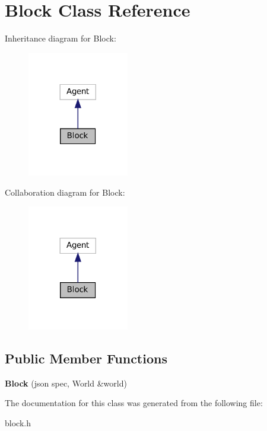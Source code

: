 \hypertarget{classBlock}{}\section{Block Class Reference}
\label{classBlock}


Inheritance diagram for Block\+:
\nopagebreak
\begin{figure}[H]
\begin{center}
\leavevmode
\includegraphics[width=125pt]{classBlock__inherit__graph}
\end{center}
\end{figure}


Collaboration diagram for Block\+:
\nopagebreak
\begin{figure}[H]
\begin{center}
\leavevmode
\includegraphics[width=125pt]{classBlock__coll__graph}
\end{center}
\end{figure}
\subsection*{Public Member Functions}
\begin{DoxyCompactItemize}
\item 
\mbox{\label{classBlock_a8ac530339fd0753127baba8a1403e2d1}} 
{\bfseries Block} (json spec, World \&world)
\end{DoxyCompactItemize}


The documentation for this class was generated from the following file\+:\begin{DoxyCompactItemize}
\item 
block.\+h\end{DoxyCompactItemize}
